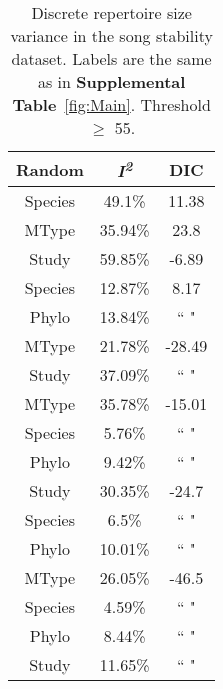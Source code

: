 \documentclass{article}
\begin{document}
  \begin{table}[H]
  \centering
  \caption{Discrete repertoire size variance in the song stability dataset. Labels are the same as in \textbf{Supplemental Table}~\ref{fig:Main}. Threshold $\ge$ 55.} 
  \begin{tabular}{ccc}
  \hline
  Random & \textit{I\textsuperscript{2}} & DIC \\ 
  \hline
  Species & 49.1\% & 11.38 \\ \hdashline
  MType & 35.94\% & 23.8 \\ \hdashline
  Study & 59.85\% & -6.89 \\ \hdashline
  Species & 12.87\% & 8.17 \\ 
  Phylo & 13.84\% & `` " \\ \hdashline
  MType & 21.78\% & -28.49 \\ 
  Study & 37.09\% & `` " \\ \hdashline
  MType & 35.78\% & -15.01 \\ 
  Species & 5.76\% & `` " \\ 
  Phylo & 9.42\% & `` " \\ \hdashline
  Study & 30.35\% & -24.7 \\ 
  Species & 6.5\% & `` " \\ 
  Phylo & 10.01\% & `` " \\ \hdashline
  MType & 26.05\% & -46.5 \\ 
  Species & 4.59\% & `` " \\ 
  Phylo & 8.44\% & `` " \\ 
  Study & 11.65\% & `` " \\ 
  \hline
  \end{tabular}
  \end{table}
\end{document}
